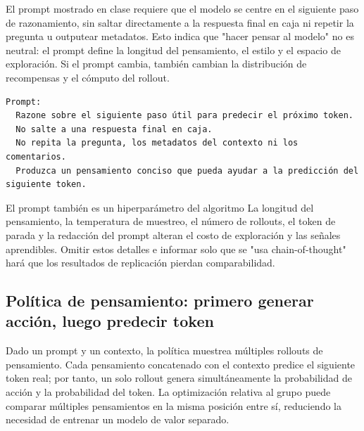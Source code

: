 El prompt mostrado en clase requiere que el modelo se centre en el siguiente paso de razonamiento, sin saltar directamente a la respuesta final en caja ni repetir la pregunta u outputear metadatos. Esto indica que "hacer pensar al modelo" no es neutral: el prompt define la longitud del pensamiento, el estilo y el espacio de exploración. Si el prompt cambia, también cambian la distribución de recompensas y el cómputo del rollout.


\begin{lstlisting}[caption={Versión simplificada de enseñanza del prompt RLP thought}]
Prompt:
  Razone sobre el siguiente paso útil para predecir el próximo token.
  No salte a una respuesta final en caja.
  No repita la pregunta, los metadatos del contexto ni los comentarios.
  Produzca un pensamiento conciso que pueda ayudar a la predicción del siguiente token.
\end{lstlisting}

\begin{warningbox}{El prompt también es un hiperparámetro del algoritmo}
La longitud del pensamiento, la temperatura de muestreo, el número de rollouts, el token de parada y la redacción del prompt alteran el costo de exploración y las señales aprendibles. Omitir estos detalles e informar solo que se "usa chain-of-thought" hará que los resultados de replicación pierdan comparabilidad.
\end{warningbox}

\subsection{Política de pensamiento: primero generar acción, luego predecir token}

Dado un prompt y un contexto, la política muestrea múltiples rollouts de pensamiento. Cada pensamiento concatenado con el contexto predice el siguiente token real; por tanto, un solo rollout genera simultáneamente la probabilidad de acción y la probabilidad del token. La optimización relativa al grupo puede comparar múltiples pensamientos en la misma posición entre sí, reduciendo la necesidad de entrenar un modelo de valor separado.


